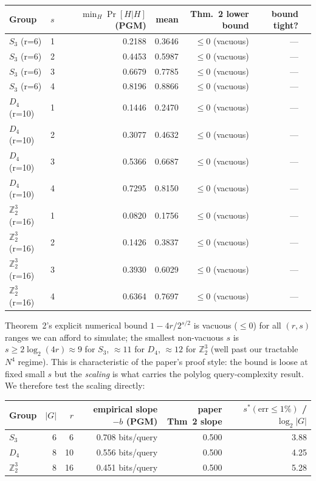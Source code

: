 \documentclass[11pt]{article}
\begin{document}
\begin{center}\small
\begin{tabular}{@{}llrrrrr@{}}
\toprule
Group & $s$ & $\min_H\Pr[H|H]$ (PGM) & mean & Thm.~2 lower bound & bound tight? \\
\midrule
$S_3$    (r=6)  & 1 & 0.2188 & 0.3646 & $\le 0$ (vacuous) & --- \\
$S_3$    (r=6)  & 2 & 0.4453 & 0.5987 & $\le 0$ (vacuous) & --- \\
$S_3$    (r=6)  & 3 & 0.6679 & 0.7785 & $\le 0$ (vacuous) & --- \\
$S_3$    (r=6)  & 4 & 0.8196 & 0.8866 & $\le 0$ (vacuous) & --- \\
\midrule
$D_4$    (r=10) & 1 & 0.1446 & 0.2470 & $\le 0$ (vacuous) & --- \\
$D_4$    (r=10) & 2 & 0.3077 & 0.4632 & $\le 0$ (vacuous) & --- \\
$D_4$    (r=10) & 3 & 0.5366 & 0.6687 & $\le 0$ (vacuous) & --- \\
$D_4$    (r=10) & 4 & 0.7295 & 0.8150 & $\le 0$ (vacuous) & --- \\
\midrule
$\mathbb{Z}_2^{3}$ (r=16) & 1 & 0.0820 & 0.1756 & $\le 0$ (vacuous) & --- \\
$\mathbb{Z}_2^{3}$ (r=16) & 2 & 0.1426 & 0.3837 & $\le 0$ (vacuous) & --- \\
$\mathbb{Z}_2^{3}$ (r=16) & 3 & 0.3930 & 0.6029 & $\le 0$ (vacuous) & --- \\
$\mathbb{Z}_2^{3}$ (r=16) & 4 & 0.6364 & 0.7697 & $\le 0$ (vacuous) & --- \\
\bottomrule
\end{tabular}
\end{center}

Theorem~2's explicit numerical bound $1 - 4r/2^{s/2}$ is vacuous
($\le 0$) for all $(r,s)$ ranges we can afford to simulate; the smallest
non-vacuous $s$ is $s\ge 2\log_2(4r) \approx 9$ for $S_3$, $\approx 11$
for $D_4$, $\approx 12$ for $\mathbb{Z}_2^{3}$ (well past our tractable
$N^{4}$ regime).  This is characteristic of the paper's proof style: the
bound is loose at fixed small $s$ but the \emph{scaling} is what carries
the polylog query-complexity result.  We therefore test the scaling
directly:

\begin{center}\small
\begin{tabular}{@{}lrrrrr@{}}
\toprule
Group & $|G|$ & $r$ & empirical slope $-b$ (PGM) & paper Thm~2 slope & $s^*(\text{err}\le 1\%)$ / $\log_2|G|$ \\
\midrule
$S_3$    & 6  &  6 & 0.708 bits/query & 0.500 & 3.88 \\
$D_4$    & 8  & 10 & 0.556 bits/query & 0.500 & 4.25 \\
$\mathbb{Z}_2^{3}$ & 8  & 16 & 0.451 bits/query & 0.500 & 5.28 \\
\bottomrule
\end{tabular}
\end{center}
\end{document}
